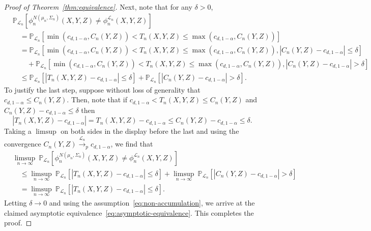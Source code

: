 \documentclass[ejs]{imsart}
\numberwithin{equation}{section}
\theoremstyle{plain}
\theoremstyle{definition}
\theoremstyle{remark}
\newcommand{\srx}{X}
\newcommand{\srz}{Z}
\newcommand{\sry}{Y}
\begin{document}
\begin{proof}[Proof of Theorem~\ref{thm:equivalence}]
	Next, note that for any $\delta > 0$,
	\small
	\begin{equation*}
		\begin{split}
			&\mathbb P_{\mathcal L_n}[\phi^{N(\mu_n, \Sigma_n)}_n(\srx, \sry, \srz) \neq \phi^{\mathcal L_n}_n(\srx, \sry, \srz)] \\
			&\quad = \mathbb P_{\mathcal L_n}[\min(c_{d,1-\alpha},C_n(\sry, \srz))  < T_n(\srx, \sry, \srz) \leq \max(c_{d,1-\alpha},C_n(\sry, \srz))] \\
			&\quad=\mathbb P_{\mathcal L_n}[\min(c_{d,1-\alpha},C_n(\sry, \srz))  < T_n(\srx, \sry, \srz) \leq \max(c_{d,1-\alpha},C_n(\sry, \srz)), |C_n(\sry, \srz)-c_{d,1-\alpha}| \leq \delta] \\
			&\quad \quad +  \mathbb P_{\mathcal L_n}[\min(c_{d,1-\alpha},C_n(\sry, \srz))  < T_n(\srx, \sry, \srz) \leq \max(c_{d,1-\alpha},C_n(\sry, \srz)), |C_n(\sry, \srz)-c_{d,1-\alpha}| > \delta]\\
			&\quad\leq \mathbb P_{\mathcal L_n}[|T_n(\srx, \sry, \srz)-c_{d,1-\alpha}| \leq \delta] + \mathbb P_{\mathcal L_n}[|C_n(\sry, \srz)-c_{d,1-\alpha}| > \delta].
		\end{split}
	\end{equation*}
	\normalsize
	To justify the last step, suppose without loss of generality that $c_{d,1-\alpha} \leq C_n(\sry, \srz)$. Then, note that if $c_{d,1-\alpha} < T_n(\srx, \sry, \srz) \leq C_n(\sry, \srz)$ and $C_n(\sry, \srz)-c_{d,1-\alpha} \leq \delta$ then
	\begin{equation*}
		|T_n(\srx, \sry,\srz)-c_{d,1-\alpha}| = T_n(\srx, \sry,\srz)-c_{d,1-\alpha} \leq C_n(\sry, \srz)- c_{d,1-\alpha} \leq \delta.
	\end{equation*}
	Taking a $\limsup$ on both sides in the display before the last and using the convergence $C_n(\sry,\srz)  \overset{\mathcal L_n}\rightarrow_p c_{d,1-\alpha}$, we find that
	\begin{equation*}
		\begin{split}
			&\limsup_{n \rightarrow \infty}\ \mathbb P_{\mathcal L_n}[\phi^{N(\mu_n, \Sigma_n)}_n(\srx, \sry, \srz) \neq \phi^{\mathcal L_n}_n(\srx, \sry, \srz)] \\
			&\quad \leq \limsup_{n \rightarrow \infty}\ \mathbb P_{\mathcal L_n}[|T_n(\srx, \sry, \srz)-c_{d,1-\alpha}| \leq \delta]+ \limsup_{n \rightarrow \infty}\ \mathbb P_{\mathcal L_n}[|C_n(\sry, \srz)-c_{d,1-\alpha}| > \delta] \\
			&\quad = \limsup_{n \rightarrow \infty}\ \mathbb P_{\mathcal L_n}[|T_n(\srx, \sry, \srz)-c_{d,1-\alpha}| \leq \delta].
		\end{split}
	\end{equation*}
	Letting $\delta \rightarrow 0$ and using the assumption~\eqref{eq:non-accumulation}, we arrive at the claimed asymptotic equivalence~\eqref{eq:asymptotic-equivalence}. This completes the proof.
\end{proof}
\end{document}
